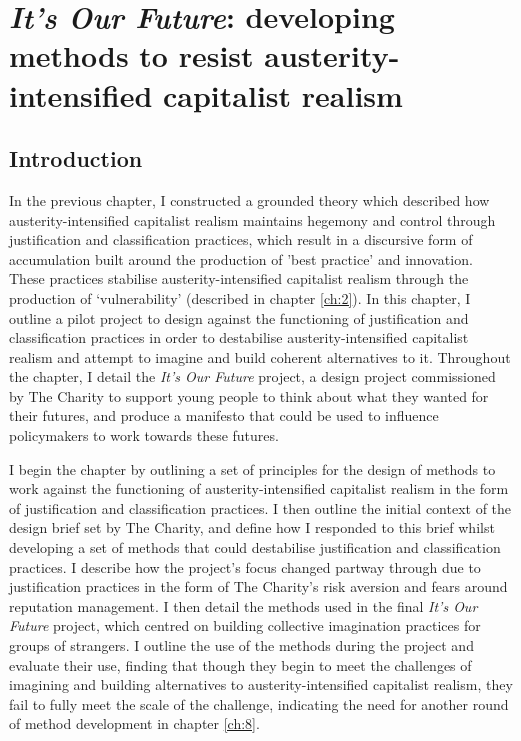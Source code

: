 \chapter{\textit{It's Our Future}: developing methods to resist austerity-intensified capitalist realism}
\label{ch:7}

\section{Introduction}
\label{sec: 7-intro}

In the previous chapter, I constructed a grounded theory which described how austerity-intensified capitalist realism maintains hegemony and control through justification and classification practices, which result in a discursive form of accumulation built around the production of 'best practice' and innovation. These practices stabilise austerity-intensified capitalist realism through the production of `vulnerability' (described in chapter \ref{ch:2}). In this chapter, I outline a pilot project to design against the functioning of justification and classification practices in order to destabilise austerity-intensified capitalist realism and attempt to imagine and build coherent alternatives to it. Throughout the chapter, I detail the \emph{It's Our Future} project, a design project commissioned by The Charity to support young people to think about what they wanted for their futures, and produce a manifesto that could be used to influence policymakers to work towards these futures.

I begin the chapter by outlining a set of principles for the design of methods to work against the functioning of austerity-intensified capitalist realism in the form of justification and classification practices. I then outline the initial context of the design brief set by The Charity, and define how I responded to this brief whilst developing a set of methods that could destabilise justification and classification practices. I describe how the project's focus changed partway through due to justification practices in the form of The Charity's risk aversion and fears around reputation management. I then detail the methods used in the final \emph{It's Our Future} project, which centred on building collective imagination practices for groups of strangers. I outline the use of the methods during the project and evaluate their use, finding that though they begin to meet the challenges of imagining and building alternatives to austerity-intensified capitalist realism, they fail to fully meet the scale of the challenge, indicating the need for another round of method development in chapter \ref{ch:8}. 

